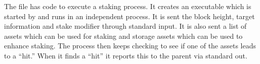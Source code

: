 The file {} has code to execute a staking process.
It creates an executable which is started by {}
and runs in an independent process. It is sent the block height, target information
and stake modifier through standard input. It is also sent a list of assets
which can be used for staking
and storage assets which can be used to enhance staking.
The process then keeps checking to see if one of the
assets leads to a ``hit.'' When it finds a ``hit'' it reports this to
the parent via standard out.
